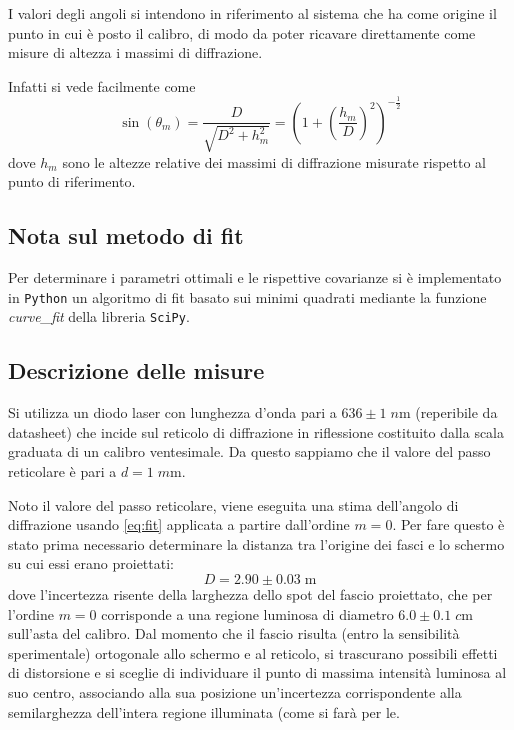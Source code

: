 \documentclass[10pt, a4paper, italian]{article}
\begin{document}
I valori degli angoli si intendono in riferimento al sistema che ha come
origine il punto in cui è posto il calibro, di modo da poter ricavare
direttamente come misure di altezza i massimi di diffrazione.

Infatti si vede facilmente come
\begin{equation}
\sin(\theta _m) = \frac{D}{\sqrt{D^2 + h_m^2}} = 
\left(1 + \left(\frac{h_m}{D}\right)^2\right)^{-\frac{1}{2}}
\label{eq: gon}
\end{equation}
dove $h_m$ sono le altezze relative dei massimi di diffrazione misurate
rispetto al punto di riferimento.

\subsection{Nota sul metodo di fit}
Per determinare i parametri ottimali e le rispettive covarianze si \`e
implementato in \verb+Python+ un algoritmo di fit basato sui minimi quadrati
mediante la funzione \emph{curve\_fit} della libreria \texttt{SciPy}.

\subsection{Descrizione delle misure}
Si utilizza un diodo laser con lunghezza d'onda pari a $636 \pm 1 \; \si{n\m}$
(reperibile da datasheet) che incide sul reticolo di diffrazione in
riflessione costituito dalla scala graduata di un calibro ventesimale.
Da questo sappiamo che il valore del passo reticolare è pari a
$d = 1 \; \si{m\m}$.

Noto il valore del passo reticolare, viene eseguita una stima dell'angolo di
diffrazione usando \cref{eq:fit} applicata a partire dall'ordine $m = 0$.
Per fare questo è stato prima necessario determinare la distanza tra l'origine
dei fasci e lo schermo su cui essi erano proiettati:
\[
D = 2.90 \pm 0.03 \; \si{\m}
\]
dove l'incertezza risente della larghezza dello spot del fascio proiettato,
che per l'ordine $m = 0$ corrisponde a una regione luminosa di diametro
$6.0 \pm 0.1 \; \si{c\m}$ sull'asta del calibro.
Dal momento che il fascio risulta (entro la sensibilità sperimentale)
ortogonale allo schermo e al reticolo, si trascurano possibili effetti di
distorsione e si sceglie di individuare il punto di massima intensità luminosa
al suo centro, associando alla sua posizione un'incertezza corrispondente
alla semilarghezza dell'intera regione illuminata (come si farà per le.
\end{document}
